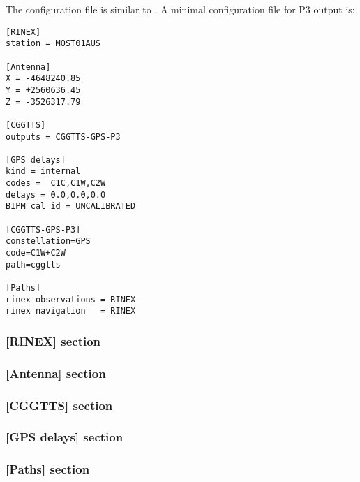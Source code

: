 The configuration file is similar to .
A minimal configuration file for P3 output is:

\begin{lstlisting}
[RINEX]
station = MOST01AUS

[Antenna]
X = -4648240.85 
Y = +2560636.45 
Z = -3526317.79 

[CGGTTS]
outputs = CGGTTS-GPS-P3

[GPS delays]
kind = internal
codes =  C1C,C1W,C2W
delays = 0.0,0.0,0.0
BIPM cal id = UNCALIBRATED

[CGGTTS-GPS-P3]
constellation=GPS
code=C1W+C2W
path=cggtts

[Paths]
rinex observations = RINEX
rinex navigation   = RINEX

\end{lstlisting}

\subsubsection{[RINEX] section }

\subsubsection{[Antenna] section }

\subsubsection{[CGGTTS] section }

\subsubsection{[GPS delays] section }

\subsubsection{[Paths] section }



